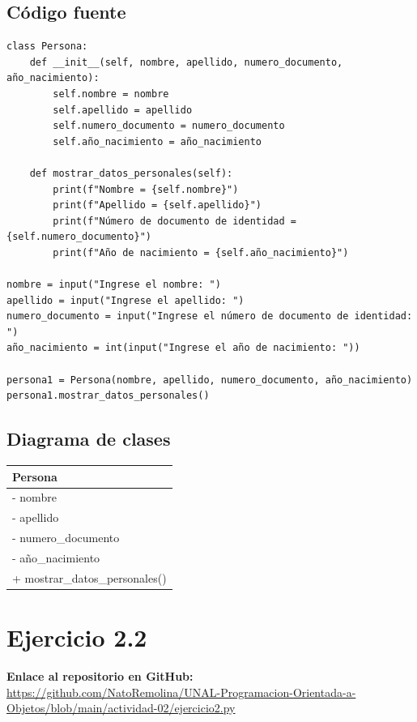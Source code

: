 \documentclass[11pt, a4paper]{article}
\newcommand{\clasebox}[3]{%
\begin{center}
\begin{tabular}{|l|}
\hline
\textbf{#1} \\
\hline
#2
\hline
#3
\hline
\end{tabular}
\end{center}
}
\begin{document}
\subsection{Código fuente}
\begin{lstlisting}
class Persona:
    def __init__(self, nombre, apellido, numero_documento, año_nacimiento):
        self.nombre = nombre
        self.apellido = apellido
        self.numero_documento = numero_documento
        self.año_nacimiento = año_nacimiento

    def mostrar_datos_personales(self):
        print(f"Nombre = {self.nombre}")
        print(f"Apellido = {self.apellido}")
        print(f"Número de documento de identidad = {self.numero_documento}")
        print(f"Año de nacimiento = {self.año_nacimiento}")

nombre = input("Ingrese el nombre: ")
apellido = input("Ingrese el apellido: ")
numero_documento = input("Ingrese el número de documento de identidad: ")
año_nacimiento = int(input("Ingrese el año de nacimiento: "))

persona1 = Persona(nombre, apellido, numero_documento, año_nacimiento)
persona1.mostrar_datos_personales()
\end{lstlisting}

\subsection{Diagrama de clases}
\clasebox{Persona}
{%
- nombre \\
- apellido \\
- numero\_documento \\
- año\_nacimiento \\
}
{%
+ mostrar\_datos\_personales() \\
}

\newpage
\section{Ejercicio 2.2}

\noindent \textbf{Enlace al repositorio en GitHub:} \\
\url{https://github.com/NatoRemolina/UNAL-Programacion-Orientada-a-Objetos/blob/main/actividad-02/ejercicio2.py}
\end{document}
